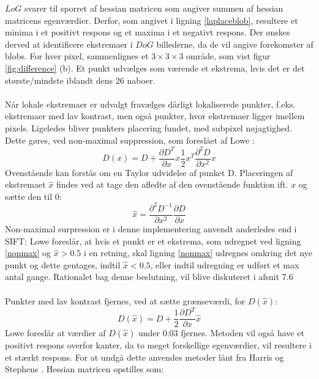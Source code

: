 $LoG$ svarer til sporret af hessian matricen som angiver summen af hessian matricens egenværdier. Derfor, som angivet i ligning \eqref{laplaceblob}, resultere et minima i et positivt respons og et maxima i et negativt respons. Der ønskes derved at identificere ekstremaer i $DoG$ billederne, da de vil angive forekomster af blobs. For hver pixel, sammenlignes et $3\times3\times3$ område, som vist figur \ref{fig:difference} (b). Et punkt udvælges som værende et ekstrema, hvis det er det største/mindste iblandt dens 26 naboer.
\\
\\
Når lokale ekstremaer er udvalgt fravælges dårligt lokaliserede punkter, f.eks. ekstremaer med lav kontrast, men også punkter, hvor ekstremaer ligger imellem pixels. Ligeledes bliver punkters placering fundet, med subpixel nøjagtighed. Dette gøres, ved non-maximal suppression, som foreslået af Lowe \cite{nonmaximalsuppression}:
\begin{equation}
D(x)=D+\dfrac{\partial D^T}{\partial x}x\dfrac{1}{2}x^T\dfrac{\partial^2D}{\partial x^2}x
\label{nonmax}
\end{equation}
Ovenstående kan forstås om en Taylor udvidelse af punket D.
Placeringen af ekstremaet $\hat{x}$ findes ved at tage den afledte af den ovenstående funktion ift. $x$ og sætte den til 0:
\begin{equation}
\hat{x}= \dfrac{\partial^2 D^{-1}}{\partial x^2}\dfrac{\partial D}{\partial x}
\label{xhat}
\end{equation}
Non-maximal surpression er i denne implementering anvendt anderledes end i SIFT: Lowe foreslår, at hvis et punkt er et ekstrema, som udregnet ved ligning \eqref{nonmax} og $\hat{x} > 0.5$ i en retning, skal ligning \eqref{nonmax} udregnes omkring det nye punkt og dette gentages, indtil $\hat{x} < 0.5$, eller indtil udregning er udført et max antal gange. Rationalet bag denne beslutning, vil blive diskuteret i afsnit 7.6
\\
\\
Punkter med lav kontrast fjernes, ved at sætte grænseværdi, for $D(\hat{x})$:
\begin{equation}
D(\hat{x})=D+\dfrac{1}{2}\dfrac{\partial D^T}{\partial x}\hat{x}
\label{dxhat}
\end{equation}
Lowe foreslår at værdier af $D(\hat{x})$ under 0.03 fjernes. Metoden vil også have et positivt respons overfor kanter, da to meget forskellige egenværdier, vil resultere i et stærkt respons.
For at undgå dette anvendes metoder lånt fra Harris og Stephens \cite{harris}. Hessian matricen opstilles som:
